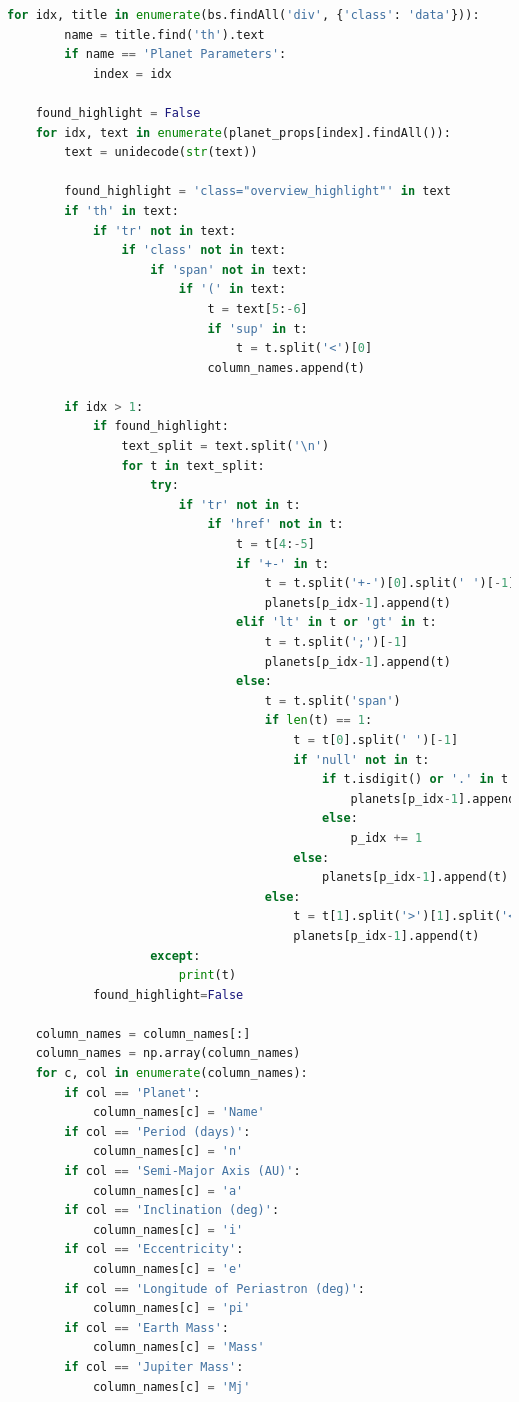 \documentclass[11pt, oneside]{article}   	%
\begin{document}
\begin{lstlisting}[language=Python, caption={Extracting data from \href{https://exoplanetarchive.ipac.caltech.edu/}{Nasa Exoplanet Archive}}]
    for idx, title in enumerate(bs.findAll('div', {'class': 'data'})):
        name = title.find('th').text
        if name == 'Planet Parameters':
            index = idx

    found_highlight = False
    for idx, text in enumerate(planet_props[index].findAll()):
        text = unidecode(str(text))

        found_highlight = 'class="overview_highlight"' in text
        if 'th' in text:
            if 'tr' not in text:
                if 'class' not in text:
                    if 'span' not in text:
                        if '(' in text:
                            t = text[5:-6]
                            if 'sup' in t:
                                t = t.split('<')[0]
                            column_names.append(t)
                            
        if idx > 1:
            if found_highlight:
                text_split = text.split('\n')
                for t in text_split:
                    try:
                        if 'tr' not in t:
                            if 'href' not in t:
                                t = t[4:-5]
                                if '+-' in t:
                                    t = t.split('+-')[0].split(' ')[-1]
                                    planets[p_idx-1].append(t)
                                elif 'lt' in t or 'gt' in t:
                                    t = t.split(';')[-1]
                                    planets[p_idx-1].append(t)
                                else:
                                    t = t.split('span')
                                    if len(t) == 1:
                                        t = t[0].split(' ')[-1]
                                        if 'null' not in t:
                                            if t.isdigit() or '.' in t:
                                                planets[p_idx-1].append(t)
                                            else:
                                                p_idx += 1
                                        else:
                                            planets[p_idx-1].append(t)
                                    else:
                                        t = t[1].split('>')[1].split('<')[0]
                                        planets[p_idx-1].append(t)
                    except:
                        print(t)
            found_highlight=False

    column_names = column_names[:]
    column_names = np.array(column_names)
    for c, col in enumerate(column_names):
        if col == 'Planet':
            column_names[c] = 'Name'
        if col == 'Period (days)':
            column_names[c] = 'n'
        if col == 'Semi-Major Axis (AU)':
            column_names[c] = 'a'
        if col == 'Inclination (deg)':
            column_names[c] = 'i'
        if col == 'Eccentricity':
            column_names[c] = 'e'
        if col == 'Longitude of Periastron (deg)':
            column_names[c] = 'pi'
        if col == 'Earth Mass':
            column_names[c] = 'Mass'
        if col == 'Jupiter Mass':
            column_names[c] = 'Mj'


\end{lstlisting}
\end{document}
